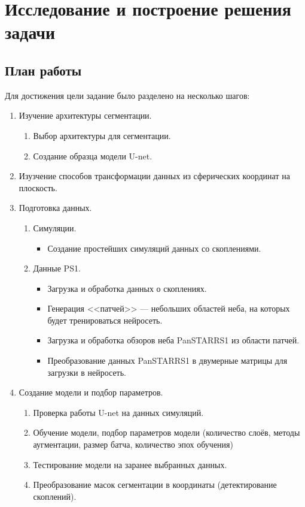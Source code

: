 \chapter{Исследование и построение решения задачи}
\label{cha:ch_3}

\section{План работы}
Для достижения цели задание было разделено на несколько шагов:

\begin{enumerate}

    \item Изучение архитектуры сегментации.
    \begin{enumerate}
        \item Выбор архитектуры для сегментации.
        \item Создание образца модели U-net.
    \end{enumerate}

    \item Изузчение способов трансформации данных из сферических координат на плоскость.
    \item Подготовка данных.
    \begin{enumerate}
        \item Симуляции.
        \begin{itemize}
            \item Создание простейших симуляций данных со скоплениями.
        \end{itemize}
        \item Данные PS1.
        \begin{itemize}
            \item Загрузка и обработка данных о скоплениях.
            \item Генерация <<патчей>> --- небольших областей неба, на которых будет тренироваться нейросеть.
            \item Загрузка и обработка обзоров неба PanSTARRS1 из области патчей.
            \item Преобразование данных PanSTARRS1 в двумерные матрицы для загрузки в нейросеть.
        \end{itemize}
    \end{enumerate}

    \item Создание модели и подбор параметров.
    \begin{enumerate}
        \item Проверка работы U-net на данных симуляций.
        \item Обучение модели, подбор параметров модели (количество слоёв, методы аугментации, размер 
            батча, количество эпох обучения)
        \item Тестирование модели на заранее выбранных данных.
        \item Преобразование масок сегментации в координаты (детектирование скоплений).
    \end{enumerate}


\end{enumerate}
